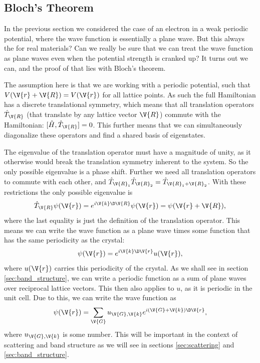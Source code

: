 \documentclass[main.tex]{subfiles}
\begin{document}
	
	
	\subsection{Bloch's Theorem}
	In the previous section we considered the case of an electron in a weak periodic potential, where the wave function is essentially a plane wave. But this always the for real materials? Can we really be sure that we can treat the wave function as plane waves even when the potential strength is cranked up? It turns out we can, and the proof of that lies with Bloch's theorem.
	
	The assumption here is that we are working with a periodic potential, such that $ V(\V{r} + \V{R}) = V(\V{r}) $ for all lattice points. As such the full Hamiltonian has a discrete translational symmetry, which means that all translation operators $ \hat{T}_{\V{R}} $ (that translate by any lattice vector $ \V{R} $) commute with the Hamiltonian: $ [\hat{H}, \hat{T}_{\V{R}}] = 0$. This further means that we can simultaneously diagonalize these operators and find a shared basis of eigenstates.
	
	The eigenvalue of the translation operator must have a magnitude of unity, as it otherwise would break the translation symmetry inherent to the system. So the only possible eigenvalue is a phase shift. Further we need all translation operators to commute with each other, and $ \hat{T}_{\V{R}_1} \hat{T}_{\V{R}_2} = \hat{T}_{\V{R}_1 + \V{R}_2} $. With these restrictions the only possible eigenvalue is
	\begin{equation}
		\hat{T}_{\V{R}} \psi(\V{r}) = e^{i\V{k} \D\V{R}} \psi(\V{r}) = \psi(\V{r}+\V{R}),
	\end{equation}
	where the last equality is just the definition of the translation operator. This means we can write the wave function as a plane wave times some function that has the same periodicity as the crystal:
	\begin{equation}
		\psi(\V{r}) = e^{i\V{k} \D \V{r}} u(\V{r}),
	\end{equation}
	where $ u(\V{r}) $ carries this periodicity of the crystal. As we shall see in section \ref{sec:band_structure}, we can write a periodic function as a sum of plane waves over reciprocal lattice vectors. This then also applies to $ u $, as it is periodic in the unit cell. Due to this, we can write the wave function as
	\begin{equation}
		\psi(\V{r}) = \sum_{\V{G}} u_{\V{G},\V{k}} e^{i(\V{G} + \V{k}) \D \V{r}},
	\end{equation}
	where $ u_{\V{G},\V{k}} $ is some number. This will be important in the context of scattering and band structure as we will see in sections \ref{sec:scattering} and \ref{sec:band_structure}.
	
\end{document}
